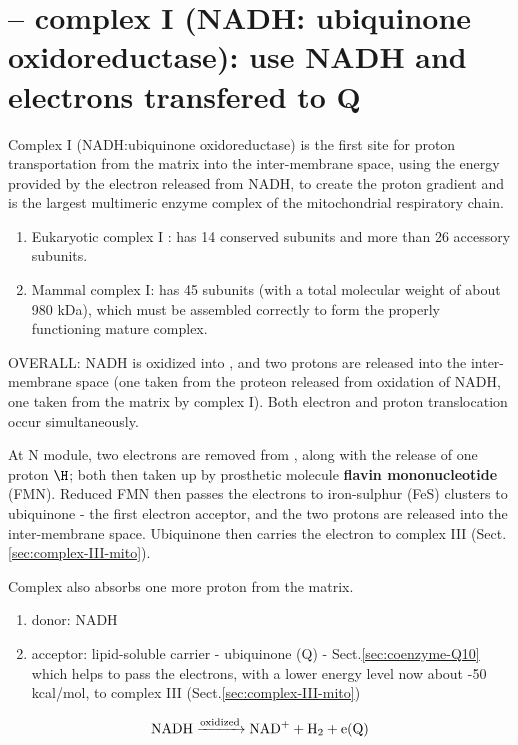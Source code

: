 \section{-- complex I ({\bf NADH: ubiquinone oxidoreductase}): use NADH and
electrons transfered to Q}
\label{sec:complex-I-mito}

Complex I (NADH:ubiquinone oxidoreductase) is the first site for proton
transportation from the matrix into the inter-membrane space, using the energy
provided by the electron released from NADH, to create the
proton gradient and is the largest multimeric enzyme complex of the
mitochondrial respiratory chain.

\begin{enumerate}
  \item Eukaryotic complex I : has 14 conserved subunits and more than 26
  accessory subunits.

  \item Mammal complex I: has  45 subunits (with a total molecular weight of
  about 980 kDa), which must be assembled correctly to form the properly
  functioning mature complex.
\end{enumerate}


\begin{mdframed}
OVERALL: NADH is oxidized into , and two protons are released into the
inter-membrane space (one taken from the proteon released from oxidation of
NADH, one taken from the matrix by complex I).
Both electron and proton translocation occur simultaneously.

At N module, two electrons are removed from , along with the release
of one proton $\H$; both then taken up by prosthetic molecule {\bf flavin
mononucleotide} (FMN). Reduced FMN then passes the electrons to iron-sulphur
(FeS) clusters to ubiquinone - the first electron acceptor, and the two protons
are released into the inter-membrane space. Ubiquinone then carries the electron
to complex III (Sect.\ref{sec:complex-III-mito}).

Complex also absorbs one more proton from the matrix.
\begin{enumerate}
  \item donor: NADH

  \item acceptor: lipid-soluble carrier - ubiquinone (Q) -
  Sect.\ref{sec:coenzyme-Q10} which helps to pass the electrons, with a lower
  energy level now about -50 kcal/mol, to complex III
  (Sect.\ref{sec:complex-III-mito})
\end{enumerate}

  \begin{equation}
    \label{eq:12}
      \ce{NADH ->[oxidized] NAD+ + H2 + e(Q)}
  \end{equation}

\end{mdframed}

